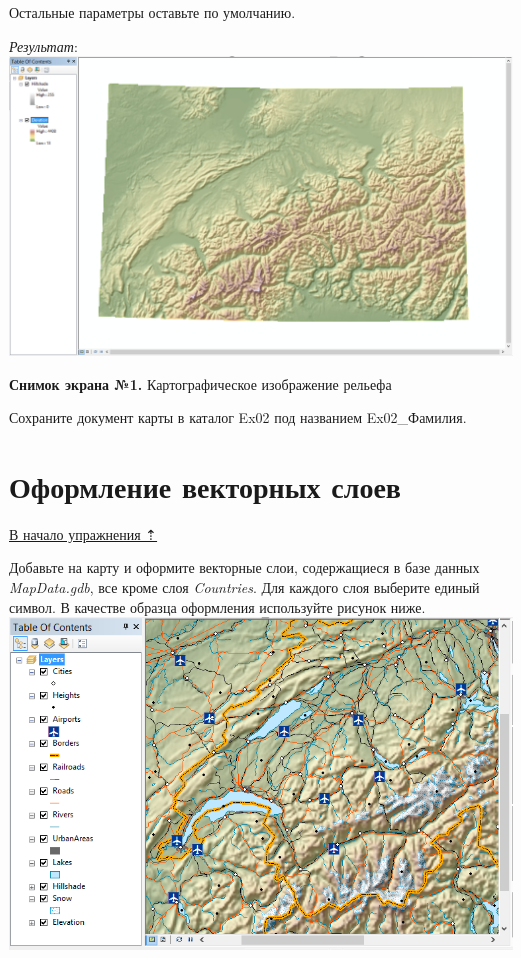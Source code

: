 \documentclass[12pt,]{book}
\begin{document}
\begin{enumerate}
  Остальные параметры оставьте по умолчанию.

  \emph{Результат}:
  \includegraphics{images/Ex02/image13.png}
\end{enumerate}

\textbf{Снимок экрана №1.} Картографическое изображение рельефа

Сохраните документ карты в каталог Ex02 под названием Ex02\_Фамилия.

\hypertarget{map-design-general-vector}{%
\section{Оформление векторных слоев}\label{map-design-general-vector}}

\protect\hyperlink{map-design-general}{В начало упражнения ⇡}

Добавьте на карту и оформите векторные слои, содержащиеся в базе данных \emph{MapData.gdb}, все кроме слоя \emph{Countries}. Для каждого слоя выберите единый символ. В качестве образца оформления используйте рисунок ниже.
\includegraphics{images/Ex02/image14.png}
\end{document}
